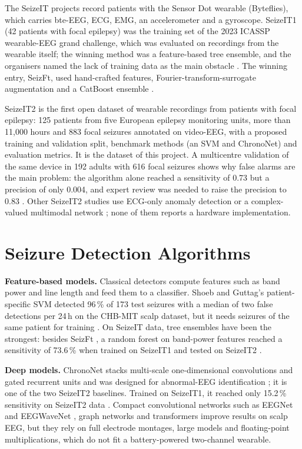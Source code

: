 The SeizeIT projects record patients with the Sensor Dot wearable (Byteflies), which carries bte-EEG, ECG, EMG, an
accelerometer and a gyroscope. SeizeIT1 (42 patients with focal epilepsy) was the training set of the 2023 ICASSP
wearable-EEG grand challenge, which was evaluated on recordings from the wearable itself; the winning method was a
feature-based tree ensemble, and the organisers named the lack of training data as the main obstacle
\cite{bhagubai2024challenge}. The winning entry, SeizFt, used hand-crafted features, Fourier-transform-surrogate
augmentation and a CatBoost ensemble \cite{alhussaini2023seizft}.

SeizeIT2 \cite{bhagubai2025seizeit2} is the first open dataset of wearable recordings from patients with focal
epilepsy: 125 patients from five European epilepsy monitoring units, more than 11,000 hours and 883 focal seizures
annotated on video-EEG, with a proposed training and validation split, benchmark methods (an SVM and ChronoNet) and
evaluation metrics. It is the dataset of this project. A multicentre validation of the same device in 192 adults with
616 focal seizures shows why false alarms are the main problem: the algorithm alone reached a sensitivity of 0.73 but
a precision of only 0.004, and expert review was needed to raise the precision to 0.83 \cite{swinnen2026seizeit2}.
Other SeizeIT2 studies use ECG-only anomaly detection \cite{reintjes2025ecg} or a complex-valued multimodal network
\cite{su2026cmepinet}; none of them reports a hardware implementation.

\section{Seizure Detection Algorithms}\label{sec:lit-alg}

\textbf{Feature-based models.} Classical detectors compute features such as band power and line length and feed them
to a classifier. Shoeb and Guttag's patient-specific SVM detected 96\,\% of 173 test seizures with a median of two false
detections per 24\,h on the CHB-MIT scalp dataset, but it needs seizures of the same patient for training
\cite{shoeb2010icml}. On SeizeIT data, tree ensembles have been the strongest: besides SeizFt
\cite{alhussaini2023seizft}, a random forest on band-power features reached a sensitivity of 73.6\,\% when trained on
SeizeIT1 and tested on SeizeIT2 \cite{huang2023lightweight}.

\textbf{Deep models.} ChronoNet stacks multi-scale one-dimensional convolutions and gated recurrent units and was
designed for abnormal-EEG identification \cite{roy2019chrononet}; it is one of the two SeizeIT2 baselines. Trained on
SeizeIT1, it reached only 15.2\,\% sensitivity on SeizeIT2 data \cite{huang2023lightweight}. Compact convolutional
networks such as EEGNet \cite{lawhern2018eegnet} and EEGWaveNet \cite{thuwajit2022eegwavenet}, graph networks
\cite{tang2022gnnssl} and transformers \cite{wu2025seizuretransformer,yang2023biot} improve results on scalp EEG, but
they rely on full electrode montages, large models and floating-point multiplications, which do not fit a
battery-powered two-channel wearable.

